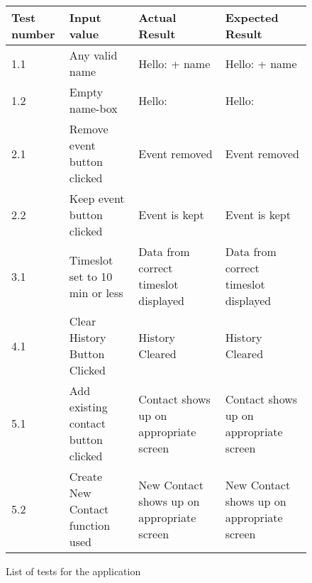 \begin{figure}[h]
\label{tab:testList}
\caption{List of tests for the application}
\begin{tabular}{|p{}||p{}|p{}|p{}|}
\hline
Test number & Input value& Actual Result& Expected Result \\
\hline
\hline 
1.1 & Any valid name & Hello: + name & Hello: + name \\ 
\hline 
1.2 & Empty name-box & Hello: &Hello:  \\ 
\hline 
2.1 & Remove event button clicked & Event removed & Event removed \\ 
\hline 
2.2 & Keep event button clicked & Event is kept & Event is kept \\ 
\hline 
3.1 & Timeslot set to 10 min or less & Data from correct timeslot displayed & Data from correct timeslot displayed \\ 
\hline 
4.1 & Clear History Button Clicked & History Cleared & History Cleared \\ 
\hline 
5.1 & Add existing contact button clicked & Contact shows up on appropriate screen  & Contact shows up on appropriate screen \\ 
\hline 
5.2 & Create New Contact function used & New Contact shows up on appropriate screen & New Contact shows up on appropriate screen \\ 
\hline 

\end{tabular} 
\end{figure}
